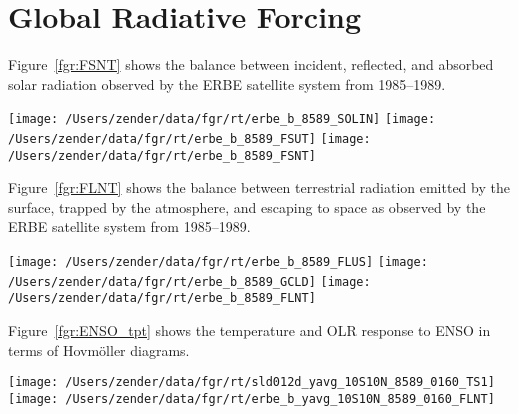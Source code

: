 \documentclass[12pt]{article}
\begin{document}
\section[Global Radiative Forcing]{Global Radiative Forcing}\label{sxn:rad_frc}
Figure~\ref{fgr:FSNT} shows the balance between incident, reflected,
and absorbed solar radiation observed by the ERBE satellite system
from 1985--1989.  
\begin{figure*}
\centering
\texttt{[image: /Users/zender/data/fgr/rt/erbe\_b\_8589\_SOLIN]}\vfill
\texttt{[image: /Users/zender/data/fgr/rt/erbe\_b\_8589\_FSUT]}\vfill
\texttt{[image: /Users/zender/data/fgr/rt/erbe\_b\_8589\_FSNT]}\vfill
\caption[Climatological Mean Absorbed Solar Radiation]{
Geographic distribution of 1985--1989 climatological mean (a)
insolation $\FSDT$, (b) reflected shortwave irradiance $\FSUT$, and
(c) absorbed shortwave radiation $\FSNT$~[\wxmS] from ERBE observations.
\label{fgr:FSNT}}
\end{figure*}

Figure~\ref{fgr:FLNT} shows the balance between terrestrial radiation
emitted by the surface, trapped by the atmosphere, and escaping to
space as observed by the ERBE satellite system from 1985--1989.  
\begin{figure*}
\centering
\texttt{[image: /Users/zender/data/fgr/rt/erbe\_b\_8589\_FLUS]}\vfill
\texttt{[image: /Users/zender/data/fgr/rt/erbe\_b\_8589\_GCLD]}\vfill
\texttt{[image: /Users/zender/data/fgr/rt/erbe\_b\_8589\_FLNT]}\vfill
\caption[Climatological Mean Emitted Longwave Radiation]{
Geographic distribution of 1985--1989 climatological mean terrestrial
radiation (a) emitted by the surface $\FLUS$, (b) trapped by the
atmosphere $\GCLD$, and (c) escaping to space $\FLNT$ in
[\wxmS] from ERBE observations. 
\label{fgr:FLNT}}
\end{figure*}

Figure~\ref{fgr:ENSO_tpt} shows the temperature and OLR response to ENSO
in terms of Hovm\"{o}ller diagrams.
\begin{figure*}
\centering
\texttt{[image: /Users/zender/data/fgr/rt/sld012d\_yavg\_10S10N\_8589\_0160\_TS1]}%
\texttt{[image: /Users/zender/data/fgr/rt/erbe\_b\_yavg\_10S10N\_8589\_0160\_FLNT]}
\caption[ENSO Temperature and OLR]{
Hovm\"{o}ller diagrams of (a) sea surface temperature [\K] and (b)
outgoing longwave radiation [\wxmS] over the
Equatorial Pacific (averaged 10\,\dgrs--10\,\dgrn).
Month~1 is January 1985.  
Contour intervals are 0.5\,K and 10\,\wxmS, respectively.
\label{fgr:ENSO_tpt}}
\end{figure*}
\end{document}
